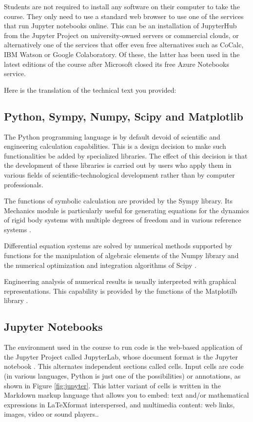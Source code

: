 Students are not required to install any software on their computer to take the course. They only need to use a standard web browser to use one of the services that run Jupyter notebooks online. This can be an installation of JupyterHub from the Jupyter Project on university-owned servers or commercial clouds, or alternatively one of the services that offer even free alternatives such as CoCalc, IBM Watson or Google Colaboratory. Of these, the latter has been used in the latest editions of the course after Microsoft closed its free Azure Notebooks service.

Here is the translation of the technical text you provided:

\subsection{Python, Sympy, Numpy, Scipy and Matplotlib}

The Python programming language is by default devoid of scientific and engineering calculation capabilities. This is a design decision to make such functionalities be added by specialized libraries. The effect of this decision is that the development of these libraries is carried out by users who apply them in various fields of scientific-technological development rather than by computer professionals.

The functions of symbolic calculation are provided by the Sympy library. Its Mechanics module is particularly useful for generating equations for the dynamics of rigid body systems with multiple degrees of freedom and in various reference systems \cite{simpy}.

Differential equation systems are solved by numerical methods supported by functions for the manipulation of algebraic elements of the Numpy library \cite{numpy} and the numerical optimization and integration algorithms of Scipy \cite{SciPy}.

Engineering analysis of numerical results is usually interpreted with graphical representations. This capability is provided by the functions of the Matplotilb library \cite{matplotlib}.

\subsection{Jupyter Notebooks}

The environment used in the course to run code is the web-based application of the Jupyter Project called JupyterLab, whose document format is the Jupyter notebook \cite{Kluyver2016jupyter}. This alternates independent sections called cells. Input cells are code (in various languages, Python is just one of the possibilities) or annotations, as shown in Figure \ref{fig:jupyter}. This latter variant of cells is written in the Markdown markup language \cite{markdown} that allows you to embed: text and/or mathematical expressions in \LaTeX format interspersed, and multimedia content: web links, images, video or sound players..

